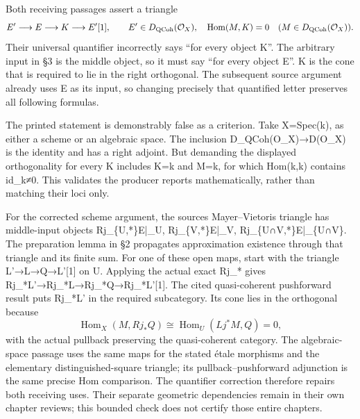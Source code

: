 Both receiving passages assert a triangle \[
 E'\longrightarrow E\longrightarrow K\longrightarrow E'[1],
 \qquad E'\in D_{\rm QCoh}(\mathcal O_X),\quad
 \operatorname{Hom}(M,K)=0\quad(M\in D_{\rm QCoh}(\mathcal O_X)).
\] Their universal quantifier incorrectly says ``for every object K''. The arbitrary input in §3 is the middle object,\allowbreak{} so it must say ``for every object E''. K is the cone that is required to lie in the right orthogonal. The subsequent source argument already uses E as its input,\allowbreak{} so changing precisely that quantified letter preserves all following formulas.

The printed statement is demonstrably false as a criterion. Take X\allowbreak{}=Spec(k)\allowbreak{},\allowbreak{} as either a scheme or an algebraic space. The inclusion D\_\allowbreak{}QCoh(O\_\allowbreak{}X)\allowbreak{}\allowbreak{}→D(O\_\allowbreak{}X)\allowbreak{} is the identity and has a right adjoint. But demanding the displayed orthogonality for every K includes K\allowbreak{}=k and M\allowbreak{}=k,\allowbreak{} for which Hom(k,\allowbreak{}k)\allowbreak{} contains id\_\allowbreak{}k≠0. This validates the producer reports mathematically,\allowbreak{} rather than matching their loci only.

For the corrected scheme argument,\allowbreak{} the source\textquotesingle s Mayer–\allowbreak{}Vietoris triangle has middle-input objects Rj\_\allowbreak{}\{U,\allowbreak{}*\}E|\_\allowbreak{}U,\allowbreak{} Rj\_\allowbreak{}\{V,\allowbreak{}*\}E|\_\allowbreak{}V,\allowbreak{} Rj\_\allowbreak{}\{U∩V,\allowbreak{}*\}E|\_\allowbreak{}\{U∩V\}. The preparation lemma in §2 propagates approximation existence through that triangle and its finite sum. For one of these open maps,\allowbreak{} start with the triangle L'\allowbreak{}→L\allowbreak{}→Q\allowbreak{}→L'[1]\allowbreak{} on U. Applying the actual exact Rj\_\allowbreak{}* gives Rj\_\allowbreak{}*L'\allowbreak{}→Rj\_\allowbreak{}*L\allowbreak{}→Rj\_\allowbreak{}*Q\allowbreak{}→Rj\_\allowbreak{}*L'[1]\allowbreak{}. The cited quasi-coherent pushforward result puts Rj\_\allowbreak{}*L' in the required subcategory. Its cone lies in the orthogonal because \[
 \operatorname{Hom}_X(M,Rj_*Q)
   \cong\operatorname{Hom}_U(Lj^*M,Q)=0,
\] with the actual pullback preserving the quasi-coherent category. The algebraic-space passage uses the same maps for the stated étale morphisms and the elementary distinguished-square triangle; its pullback–\allowbreak{}pushforward adjunction is the same precise Hom comparison. The quantifier correction therefore repairs both receiving uses. Their separate geometric dependencies remain in their own chapter reviews; this bounded check does not certify those entire chapters.

